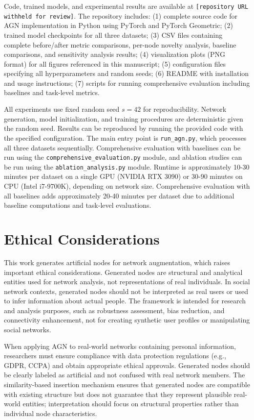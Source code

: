 \documentclass[12pt]{article}
\begin{document}
Code, trained models, and experimental results are available at \texttt{[repository URL withheld for review]}. The repository includes: (1) complete source code for AGN implementation in Python using PyTorch and PyTorch Geometric; (2) trained model checkpoints for all three datasets; (3) CSV files containing complete before/after metric comparisons, per-node novelty analysis, baseline comparisons, and sensitivity analysis results; (4) visualization plots (PNG format) for all figures referenced in this manuscript; (5) configuration files specifying all hyperparameters and random seeds; (6) README with installation and usage instructions; (7) scripts for running comprehensive evaluation including baselines and task-level metrics.

All experiments use fixed random seed $s=42$ for reproducibility. Network generation, model initialization, and training procedures are deterministic given the random seed. Results can be reproduced by running the provided code with the specified configuration. The main entry point is \texttt{run\_agn.py}, which processes all three datasets sequentially. Comprehensive evaluation with baselines can be run using the \texttt{comprehensive\_evaluation.py} module, and ablation studies can be run using the \texttt{ablation\_analysis.py} module. Runtime is approximately 10-30 minutes per dataset on a single GPU (NVIDIA RTX 3090) or 30-90 minutes on CPU (Intel i7-9700K), depending on network size. Comprehensive evaluation with all baselines adds approximately 20-40 minutes per dataset due to additional baseline computations and task-level evaluations.

\section{Ethical Considerations}

This work generates artificial nodes for network augmentation, which raises important ethical considerations. Generated nodes are structural and analytical entities used for network analysis, not representations of real individuals. In social network contexts, generated nodes should not be interpreted as real users or used to infer information about actual people. The framework is intended for research and analysis purposes, such as robustness assessment, bias reduction, and connectivity enhancement, not for creating synthetic user profiles or manipulating social networks.

When applying AGN to real-world networks containing personal information, researchers must ensure compliance with data protection regulations (e.g., GDPR, CCPA) and obtain appropriate ethical approvals. Generated nodes should be clearly labeled as artificial and not confused with real network members. The similarity-based insertion mechanism ensures that generated nodes are compatible with existing structure but does not guarantee that they represent plausible real-world entities; interpretation should focus on structural properties rather than individual node characteristics.
\end{document}
